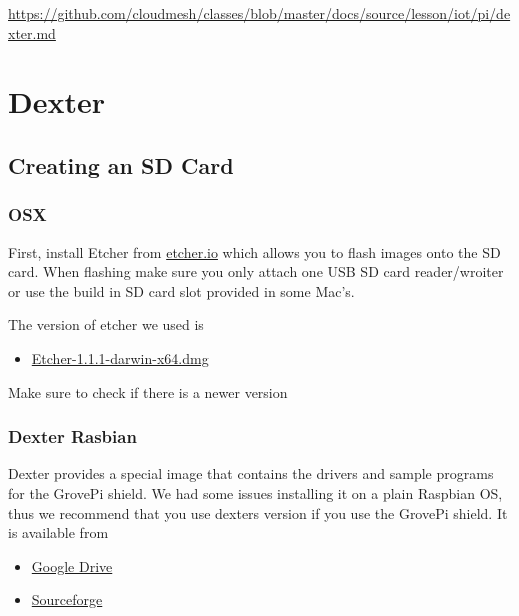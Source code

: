 \begin{fileremark}\url{https://github.com/cloudmesh/classes/blob/master/docs/source/lesson/iot/pi/dexter.md}\end{fileremark}
\section{Dexter}\label{dexter}

\subsection{Creating an SD Card}\label{creating-an-sd-card}

\subsubsection{OSX}\label{osx}

First, install Etcher from \href{https://etcher.io/}{etcher.io} which
allows you to flash images onto the SD card. When flashing make sure you
only attach one USB SD card reader/wroiter or use the build in SD card
slot provided in some Mac's.

The version of etcher we used is

\begin{itemize}
\tightlist
\item
  \href{https://github.com/resin-io/etcher/releases/download/v1.1.1/Etcher-1.1.1-darwin-x64.dmg}{Etcher-1.1.1-darwin-x64.dmg}
\end{itemize}

Make sure to check if there is a newer version

\subsubsection{Dexter Rasbian}\label{dexter-rasbian}

Dexter provides a special image that contains the drivers and sample
programs for the GrovePi shield. We had some issues installing it on a
plain Raspbian OS, thus we recommend that you use dexters version if you
use the GrovePi shield. It is available from

\begin{itemize}
\tightlist
\item
  \href{http://sourceforge.net/projects/dexterindustriesraspbianflavor/}{Google
  Drive}
\item
  \href{http://sourceforge.net/projects/dexterindustriesraspbianflavor/}{Sourceforge}
\end{itemize}


